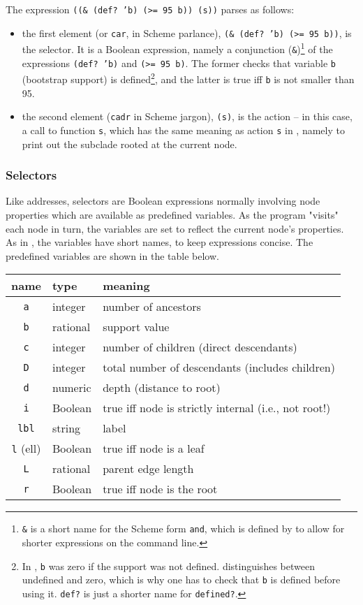 The expression \texttt{((\& (def? 'b) (>= 95 b)) (s))} parses as follows:
\begin{itemize}
	\item the first element (or \texttt{car}, in Scheme parlance),
	\texttt{(\& (def? 'b) (>= 95 b))}, is the selector.  It is a Boolean
	expression, namely a conjunction (\texttt{\&})\footnote{\texttt{\&} is
	a short name for the Scheme form \texttt{and}, which is defined by
	\sched{} to allow for shorter expressions on the command line.} of the
	expressions \texttt{(def? 'b)} and \texttt{(>= 95 b)}.  The former
	checks that variable \texttt{b} (bootstrap support) is
	defined\footnote{In \ed, \texttt{b} was zero if the support was not
	defined. \sched{} distinguishes between undefined and zero, which is
	why one has to check that \texttt{b} is defined before using it.
	\texttt{def?} is just a shorter name for \texttt{defined?}.}, and the
	latter is true iff \texttt{b} is not smaller than 95.
	\item the second element (\texttt{cadr} in Scheme jargon),
	\texttt{(s)}, is the action -- in this case, a call to function
	\texttt{s}, which has the same meaning as action \texttt{s} in \ed,
	namely to print out the subclade rooted at the current node.
\end{itemize}

\subsubsection{Selectors}

Like \ed{} addresses, \sched{} selectors are Boolean expressions normally
involving node properties which are available as predefined variables. As the
program "visits" each node in turn, the variables are set to reflect the current
node's properties. As in \ed{}, the variables have short names, to keep
expressions concise. The predefined variables are shown in the table below.

\begin{center}
\begin{tabular}{cll}
name & type & meaning \\
\hline
\texttt{a} & integer & number of ancestors  \\
\texttt{b} & rational & support value \\
\texttt{c} & integer & number of children (direct descendants) \\
\texttt{D} & integer & total number of descendants (includes children) \\
\texttt{d} & numeric & depth (distance to root) \\
\texttt{i} & Boolean & true iff node is strictly internal (i.e., not root!) \\
\texttt{lbl} & string & label \\
\texttt{l} (ell) & Boolean & true iff node is a leaf \\
\texttt{L} & rational & parent edge length \\
\texttt{r} & Boolean & true iff node is the root
\end{tabular}
\end{center}

